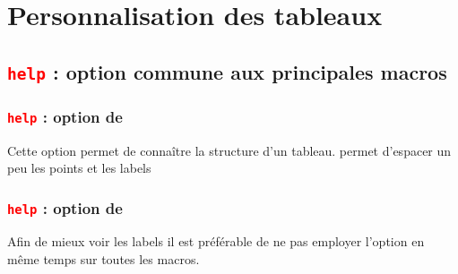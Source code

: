\section{Personnalisation des tableaux}\label{pers}

\subsection{\texttt{\textcolor{red}{help}} :  option commune aux principales macros}

\subsubsection{\texttt{\textcolor{red}{help}} :  option de }
Cette option permet de connaître la structure d'un tableau.  permet d'espacer un peu les points et les labels

\begin{tkzexample}[small]
\end{tkzexample}

 
\subsubsection{\texttt{\textcolor{red}{help}} :  option de }
Afin de mieux voir les labels il est préférable de ne pas employer l'option  en même temps sur toutes les macros. 
\begin{tkzexample}[small]
\end{tkzexample}

